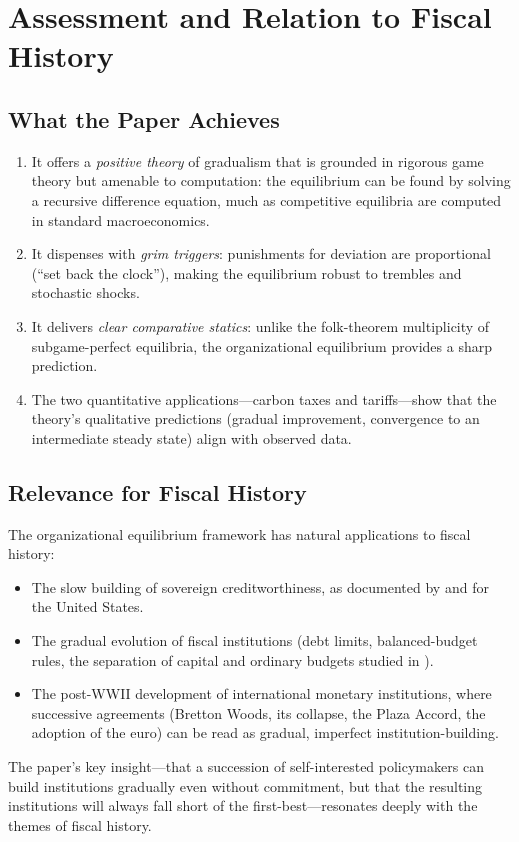 \documentclass[12pt]{article}
\begin{document}
\section{Assessment and Relation to Fiscal History}

\subsection{What the Paper Achieves}

\begin{enumerate}
  \item It offers a \emph{positive theory} of gradualism that is grounded in rigorous
    game theory but amenable to computation: the equilibrium can be found by
    solving a recursive difference equation, much as competitive equilibria are
    computed in standard macroeconomics.

  \item It dispenses with \emph{grim triggers}: punishments for deviation are
    proportional (``set back the clock''), making the equilibrium robust to
    trembles and stochastic shocks.

  \item It delivers \emph{clear comparative statics}: unlike the folk-theorem
    multiplicity of subgame-perfect equilibria, the organizational equilibrium
    provides a sharp prediction.

  \item The two quantitative applications---carbon taxes and tariffs---show that
    the theory's qualitative predictions (gradual improvement, convergence to an
    intermediate steady state) align with observed data.
\end{enumerate}

\subsection{Relevance for Fiscal History}

The organizational equilibrium framework has natural applications to fiscal
history:
\begin{itemize}
  \item The slow building of sovereign creditworthiness, as documented by
    \citet{sargent2017honoring} and \citet{hallsargent2014,hallsargent2018} for
    the United States.
  \item The gradual evolution of fiscal institutions (debt limits, balanced-budget
    rules, the separation of capital and ordinary budgets studied in
    \citealt{bassettosargent2006}).
  \item The post-WWII development of international monetary institutions, where
    successive agreements (Bretton Woods, its collapse, the Plaza Accord, the
    adoption of the euro) can be read as gradual, imperfect institution-building.
\end{itemize}

The paper's key insight---that a succession of self-interested policymakers can
build institutions gradually even without commitment, but that the resulting
institutions will always fall short of the first-best---resonates deeply with
the themes of fiscal history.




\end{document}
